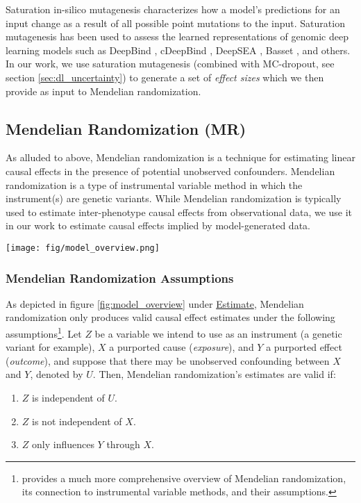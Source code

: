 \documentclass{article}
\begin{document}
Saturation in-silico mutagenesis characterizes how a model's predictions for an input change as a result of all possible point mutations to the input. Saturation mutagenesis has been used to assess the learned representations of genomic deep learning models such as DeepBind \cite{alipanahi2015predicting}, cDeepBind \cite{gandhi2018cdeepbind}, DeepSEA \cite{zhou2015predicting}, Basset \cite{kelley2016basset}, and others. In our work, we use saturation mutagenesis (combined with MC-dropout, see section \ref{sec:dl_uncertainty}) to generate a set of \textit{effect sizes} which we then provide as input to Mendelian randomization.

\subsection{Mendelian Randomization (MR)}
As alluded to above, Mendelian randomization is a technique for estimating linear causal effects in the presence of potential unobserved confounders. Mendelian randomization is a type of instrumental variable method in which the instrument(s) are genetic variants. While Mendelian randomization is typically used to estimate inter-phenotype causal effects from observational data, we use it in our work to estimate causal effects implied by model-generated data.

\begin{figure*}[htpb]
    \centering
    \texttt{[image: fig/model\_overview.png]}
    \caption{Graphical representation our algorithm's high-level steps. \underline{Predict} corresponds to steps 1 through 4 in section \ref{sec:algo_overview}. \underline{Estimate} corresponds to step 5 in section \ref{sec:algo_overview}. \underline{Aggregate} corresponds to step 6 in \ref{sec:algo_overview}.}
    \label{fig:model_overview}
\end{figure*}
\subsubsection{Mendelian Randomization Assumptions}
As depicted in figure \ref{fig:model_overview} under \underline{Estimate}, Mendelian randomization only produces valid causal effect estimates under the following assumptions\footnote{\citet{lawlor2008mendelian} provides a much more comprehensive overview of Mendelian randomization, its connection to instrumental variable methods, and their assumptions.}. Let $ Z $ be a variable we intend to use as an instrument (a genetic variant for example), $ X $ a purported cause (\textit{exposure}), and $ Y $ a purported effect (\textit{outcome}), and suppose that there may be unobserved confounding between $ X $ and $ Y $, denoted by $ U $. Then, Mendelian randomization's estimates are valid if:
\begin{enumerate}
    \item $ Z $ is independent of $ U $.
    \item $ Z $ is not independent of $ X $.
    \item $ Z $ only influences $ Y $ through $ X $.
\end{enumerate}
\end{document}
